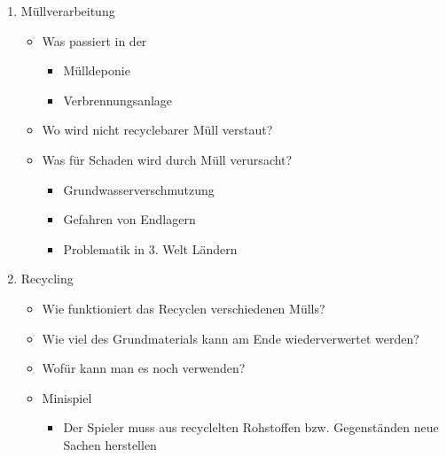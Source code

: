 \documentclass[a4paper]{article}
\begin{document}
\begin{enumerate}
\begin{enumerate}
	\item Müllverarbeitung
	\begin{itemize}
		\item Was passiert in der
		\begin{itemize}
			\item Mülldeponie
			\item Verbrennungsanlage
		\end{itemize}
		\item Wo wird nicht recyclebarer Müll verstaut?
		\item Was für Schaden wird durch Müll verursacht?
		\begin{itemize}
			\item Grundwasserverschmutzung
			\item Gefahren von Endlagern
			\item Problematik in 3. Welt Ländern
		\end{itemize}
	\end{itemize}

	\item Recycling
	\begin{itemize}
		\item Wie funktioniert das Recyclen verschiedenen Mülls?
		\item Wie viel des Grundmaterials kann am Ende wiederverwertet werden?
		\item Wofür kann man es noch verwenden?
		\item Minispiel
		\begin{itemize}
			\item Der Spieler muss aus recyclelten Rohstoffen bzw. Gegenständen neue Sachen herstellen
		\end{itemize}
	\end{itemize}


\end{enumerate}



\end{enumerate}


\makeatletter
\def\footrule{{
  \vskip-\footruleskip\vskip-\footrulewidth
  \color{\footrulecolor}
  \hrule\@width\headwidth\@height
  \footrulewidth\vskip\footruleskip
}}
\makeatother
\renewcommand{\footrulewidth}{3pt}
\newcommand{\footrulecolor}{dgreen}
\end{document}
